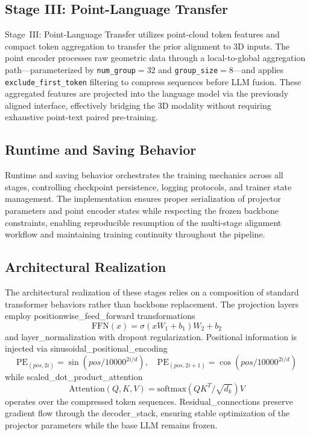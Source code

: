 \subsection{Stage III: Point-Language Transfer}

Stage~III: Point-Language Transfer utilizes point-cloud token features and compact token aggregation to transfer the prior alignment to 3D inputs. The point encoder processes raw geometric data through a local-to-global aggregation path---parameterized by \texttt{num\_group}$=32$ and \texttt{group\_size}$=8$---and applies \texttt{exclude\_first\_token} filtering to compress sequences before LLM fusion. These aggregated features are projected into the language model via the previously aligned interface, effectively bridging the 3D modality without requiring exhaustive point-text paired pre-training.

\subsection{Runtime and Saving Behavior}

Runtime and saving behavior orchestrates the training mechanics across all stages, controlling checkpoint persistence, logging protocols, and trainer state management. The implementation ensures proper serialization of projector parameters and point encoder states while respecting the frozen backbone constraints, enabling reproducible resumption of the multi-stage alignment workflow and maintaining training continuity throughout the pipeline.

\subsection{Architectural Realization}

The architectural realization of these stages relies on a composition of standard transformer behaviors rather than backbone replacement. The projection layers employ positionwise\_feed\_forward transformations
\begin{equation}
\mathrm{FFN}(x)=\sigma(xW_1+b_1)W_2+b_2
\end{equation}
and layer\_normalization with dropout regularization. Positional information is injected via sinusoidal\_positional\_encoding
\begin{equation}
\mathrm{PE}_{(pos,2i)}=\sin(pos/10000^{2i/d}),\quad \mathrm{PE}_{(pos,2i+1)}=\cos(pos/10000^{2i/d})
\end{equation}
while scaled\_dot\_product\_attention
\begin{equation}
\mathrm{Attention}(Q,K,V)=\mathrm{softmax}(QK^T/\sqrt{d_k})V
\end{equation}
operates over the compressed token sequences. Residual\_connections preserve gradient flow through the decoder\_stack, ensuring stable optimization of the projector parameters while the base LLM remains frozen.